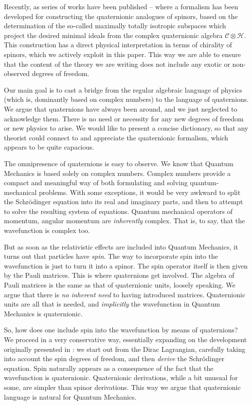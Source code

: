 \documentclass[epsfig,12pt]{article}
\newcommand{\cC}{\mathcal{C}}
\newcommand{\cH}{\mathcal{H}}
\begin{document}
	Recently, as series of works have been published \cite{Furey:2010fm}--\cite{Furey:2015tqa} where a formalism has been developed for constructing
	the quaternionic analogues of spinors, based on the determination of the so-called
	maximally totally isotropic subspaces which project the desired minimal ideals from the
	complex quaternionic algebra $ \cC \otimes \cH $.
	This construction has a direct physical interpretation in terms of chirality of spinors,
	which we actively exploit in this paper.
	This way we are able to ensure that the content of the theory we are writing does not
	include any exotic or non-observed degrees of freedom.

	Our main goal is to cast a bridge from the regular algebraic language of physics (which is, dominantly based
	on complex numbers) to the language of quaternions.
	We argue that quaternions have always been around, and we just neglected to acknowledge them.
	There is no need or necessity for any new degrees of freedom or new physics to arise.
	We would like to present a concise dictionary, so that any theorist could connect to and appreciate
	the quaternionic formalism, which appears to be quite capacious.

	The omnipresence of quaternions is easy to observe.
	We know that Quantum Mechanics is based solely on complex numbers.
	Complex numbers provide a compact and meaningful way of both formulating and solving quantum-mechanical problems.
	With some exceptions, it would be very awkward to split the Schr\"odinger equation into its real and imaginary parts,
	and then to attempt to solve the resulting system of equations.
	Quantum mechanical operators of momentum, angular momentum are \emph{inherently} complex.
	That is, to say, that the wavefunction is complex too.
	
	But as soon as the relativistic effects are included into Quantum Mechanics, it turns out that particles
	have \emph{spin}.
	The way to incorporate spin into the wavefunction is just to turn it into a spinor.
	The spin operator itself is then given by the Pauli matrices.
	This is where quaternions get involved.
	The algebra of Pauli matrices is the same as that of quaternionic units, loosely speaking.
	We argue that there is \emph{no inherent need} to having introduced matrices.
	Quaternionic units are all that is needed, and \emph{implicitly} the wavefunction in Quantum Mechanics is quaternionic.

	So, how does one include spin into the wavefunction by means of quaternions?
	We proceed in a very conservative way, essentially expanding on the development originally presented in \cite{thesis}:
	we start out from the Dirac Lagrangian, carefully taking into account the spin degrees of freedom,
	and then \emph{derive} the Schr\"odinger equation.
	Spin naturally appears as a consequence of the fact that the wavefunction is quaternionic.
	Quaternionic derivations, while a bit unusual for some, are simpler than spinor derivations.
	This way we argue that quaternionic language is natural for Quantum Mechanics.
\end{document}
